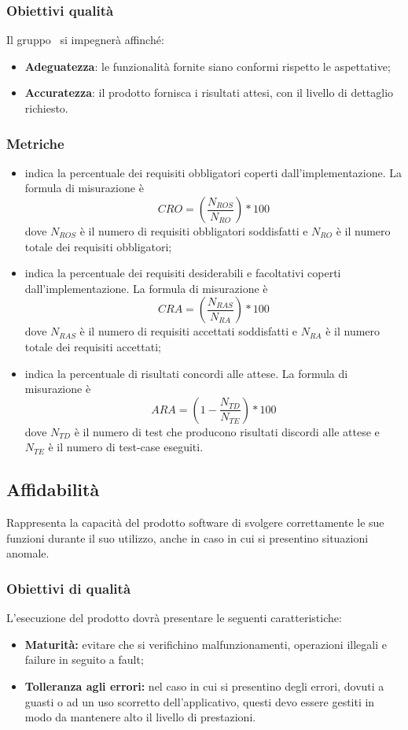 \documentclass[PianoDiQualifica.tex]{subfiles}
\begin{document}
\subsubsection{Obiettivi qualità}
Il gruppo \gruppo\ si impegnerà affinché:
\begin{itemize}
	\item \textbf{Adeguatezza}: le funzionalità fornite siano conformi rispetto le aspettative;
	\item \textbf{Accuratezza}: il prodotto fornisca i risultati attesi, con il livello di dettaglio richiesto. 
\end{itemize}	
\subsubsection{Metriche}
\begin{itemize}
	\item {} indica la percentuale dei requisiti obbligatori coperti dall'implementazione. La formula di misurazione è \[CRO=(\frac{N_{ROS}}{N_{RO}})*100\] dove $ N_{ROS} $ è il numero di requisiti obbligatori soddisfatti e $ N_{RO} $ è il numero totale dei requisiti obbligatori;
	\item {} indica la percentuale dei requisiti desiderabili e facoltativi coperti dall'implementazione. La formula di misurazione è \[CRA=(\frac{N_{RAS}}{N_{RA}})*100\] dove $ N_{RAS} $ è il numero di requisiti accettati soddisfatti e $ N_{RA } $ è il numero totale dei requisiti accettati;
	\item {} indica la percentuale di risultati concordi alle attese. La formula di misurazione è \[ARA=(1-\frac{N_{TD}}{N_{TE}})*100\] dove $ N_{TD} $ è il numero di test che producono risultati discordi alle attese e $ N_{TE} $ è il numero di test-case eseguiti.
\end{itemize}
		
\subsection{Affidabilità}
Rappresenta la capacità del prodotto software di svolgere correttamente le sue funzioni durante il suo utilizzo, anche in caso in cui si presentino situazioni anomale.
\subsubsection{Obiettivi di qualità}
L'esecuzione del prodotto dovrà presentare le seguenti caratteristiche:
\begin{itemize}
	\item \textbf{Maturità:} evitare che si verifichino malfunzionamenti, operazioni illegali e failure in seguito a fault;
	\item \textbf{Tolleranza agli errori:} nel caso in cui si presentino degli errori, dovuti a guasti o ad un uso scorretto dell'applicativo, questi devo essere gestiti in modo da mantenere alto il livello di prestazioni.
\end{itemize}
\end{document}
